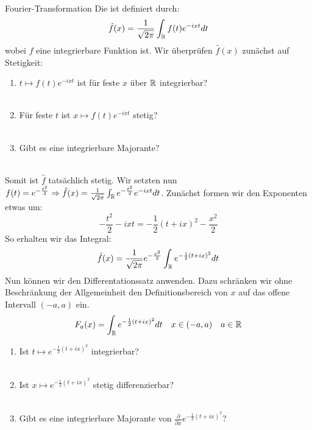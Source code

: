\begin{Beispiel}{Fourier-Transformation}
Die  ist definiert durch:
$$\hat{f}(x)=\frac{1}{\sqrt{2\pi}}\int_{\mathbb{R}} f(t)e^{-ixt}dt$$
wobei $f$ eine integrierbare Funktion ist. Wir überprüfen $\hat{f}(x)$ zunächst auf Stetigkeit: \\
\begin{enumerate}
    \item $t\mapsto f(t)e^{-ixt}$ ist für feste $x$ über $\mathbb{R}$ integrierbar? \\
    \\
    \item Für feste $t$ ist $x\mapsto f(t)e^{-ixt}$ stetig?\\
     \\
    \item Gibt es eine integrierbare Majorante? \\
    \\
\end{enumerate}
Somit ist $\hat{f}$ tatsächlich stetig. Wir setzten nun $f(t)=e^{-\frac{t^2}{2}}\Rightarrow \hat{f}(x)=\frac{1}{\sqrt{2\pi}}\int_{\mathbb{R}} e^{-\frac{t^2}{2}}e^{-ixt}dt$.
Zunächst formen wir den Exponenten etwas um: \\
$$-\frac{t^2}{2}-ixt=-\frac{1}{2}(t+ix)^2-\frac{x^2}{2}$$
So erhalten wir das Integral:
$$\hat{f}(x)=\frac{1}{\sqrt{2\pi}}e^{-\frac{x^2}{2}}\int_{\mathbb{R}} e^{-\frac{1}{2}(t+ix)^2}dt$$
Nun können wir den Differentationssatz anwenden. Dazu schränken wir ohne Beschränkung der Allgemeinheit den Definitionsbereich von $x$ auf das offene Intervall $(-a,a)$ ein.
$$F_a(x)=\int_{\mathbb{R}}e^{-\frac{1}{2}(t+ix)^2}dt \quad x\in(-a,a)\quad a\in\mathbb{R}$$
\begin{enumerate}
    \item Ist $t\mapsto e^{-\frac{1}{2}(t+ix)^2}$ integrierbar? \\
     \\
    \item Ist $x\mapsto e^{-\frac{1}{2}(t+ix)^2}$ stetig differenzierbar?\\
     \\
    \item Gibt es eine integrierbare Majorante von $\frac{\partial}{\partial x}e^{-\frac{1}{2}(t+ix)^2}$? \\

\end{enumerate}
\end{Beispiel}
